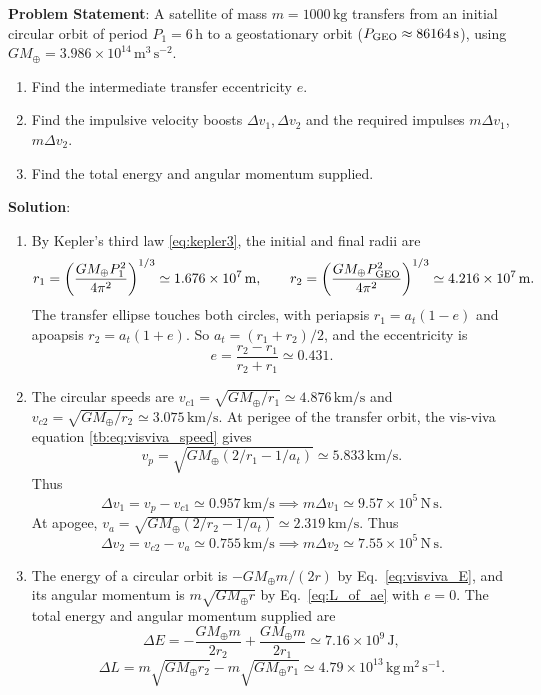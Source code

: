 \textbf{Problem Statement}: A satellite of mass $m=1000\,\mathrm{kg}$ transfers from an initial circular orbit of period $P_1 = 6\,\mathrm{h}$ to a geostationary orbit ($P_{\rm GEO} \approx 86164\,\mathrm{s}$), using $GM_\oplus=3.986\times10^{14}\,\mathrm{m^3\,s^{-2}}$.
\begin{enumerate}[label=(\alph*)]
	\item Find the intermediate transfer eccentricity $e$.
	\item Find the impulsive velocity boosts $\Delta v_1, \Delta v_2$ and the required impulses $m\Delta v_1$, $m\Delta v_2$.
	\item Find the total energy and angular momentum supplied.
\end{enumerate}

\textbf{Solution}:
\begin{enumerate}[label=(\alph*)]
	\item By Kepler's third law \eqref{eq:kepler3}, the initial and final radii are
	\[
	r_1 = \left(\frac{GM_\oplus P_1^2}{4\pi^2}\right)^{1/3} \simeq 1.676 \times 10^7\,\mathrm{m}, \qquad r_2 = \left(\frac{GM_\oplus P_{\rm GEO}^2}{4\pi^2}\right)^{1/3} \simeq 4.216 \times 10^7\,\mathrm{m}.
	\]
	The transfer ellipse touches both circles, with periapsis $r_1=a_t(1-e)$ and apoapsis $r_2=a_t(1+e)$. So $a_t = (r_1+r_2)/2$, and the eccentricity is
	\[
	\boxed{e = \frac{r_2-r_1}{r_2+r_1} \simeq 0.431}.
	\]
	\item The circular speeds are $v_{c1} = \sqrt{GM_\oplus/r_1} \simeq 4.876\,\mathrm{km/s}$ and $v_{c2} = \sqrt{GM_\oplus/r_2} \simeq 3.075\,\mathrm{km/s}$.
	At perigee of the transfer orbit, the vis-viva equation \eqref{tb:eq:visviva_speed} gives
	\[
	v_p = \sqrt{GM_\oplus(2/r_1 - 1/a_t)} \simeq 5.833\,\mathrm{km/s}.
	\]
	Thus
	\[
	\Delta v_1 = v_p - v_{c1} \simeq 0.957\,\mathrm{km/s} \implies \boxed{m\Delta v_1 \simeq 9.57 \times 10^5\,\mathrm{N\,s}}.
	\]
	At apogee, $v_a = \sqrt{GM_\oplus(2/r_2 - 1/a_t)} \simeq 2.319\,\mathrm{km/s}$. Thus
	\[
	\Delta v_2 = v_{c2} - v_a \simeq 0.755\,\mathrm{km/s} \implies \boxed{m\Delta v_2 \simeq 7.55 \times 10^5\,\mathrm{N\,s}}.
	\]
	\item The energy of a circular orbit is $-GM_\oplus m/(2r)$ by Eq.~\eqref{eq:visviva_E}, and its angular momentum is $m\sqrt{GM_\oplus r}$ by Eq.~\eqref{eq:L_of_ae} with $e=0$. The total energy and angular momentum supplied are
	\[
	\boxed{\Delta E = -\frac{GM_\oplus m}{2r_2} + \frac{GM_\oplus m}{2r_1} \simeq 7.16 \times 10^9\,\mathrm{J}},
	\]
	\[
	\boxed{\Delta L = m\sqrt{GM_\oplus r_2} - m\sqrt{GM_\oplus r_1} \simeq 4.79 \times 10^{13}\,\mathrm{kg\,m^2\,s^{-1}}}.
	\]
\end{enumerate}


